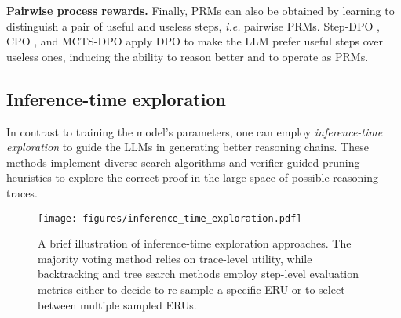 \textbf{Pairwise process rewards.} \hspace{0.1cm} Finally, PRMs can also be obtained by learning to distinguish a pair of useful and useless steps, \textit{i.e.} pairwise PRMs. Step-DPO \citep{lai2024stepdpostepwisepreferenceoptimization}, CPO \citep{zhang2024chainpreferenceoptimizationimproving}, and MCTS-DPO \citep{xie2024montecarlotreesearch} apply DPO to make the LLM prefer useful steps over useless ones, inducing the ability to reason better and to operate as PRMs.

\subsection{Inference-time exploration}
\label{sec:inference-time-exploration}

In contrast to training the model's parameters, one can employ \textit{inference-time exploration} to guide the LLMs in generating better reasoning chains. These methods implement diverse search algorithms and verifier-guided pruning heuristics to explore the correct proof in the large space of possible reasoning traces.

\begin{figure}
    \centering
    \texttt{[image: figures/inference\_time\_exploration.pdf]}
    \caption{A brief illustration of inference-time exploration approaches. The majority voting method relies on trace-level utility, while backtracking and tree search methods employ step-level evaluation metrics either to decide to re-sample a specific ERU or to select between multiple sampled ERUs.}
    \label{fig:inference-time-exploration}
\end{figure}




